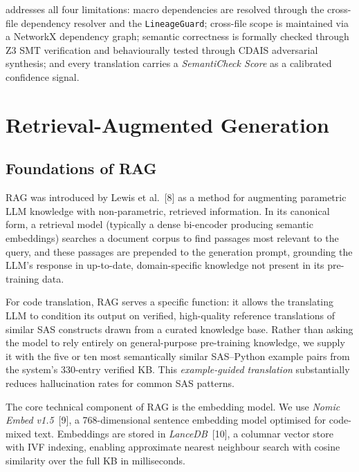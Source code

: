 \codara{} addresses all four limitations: macro dependencies are resolved
through the cross-file dependency resolver and the \texttt{LineageGuard};
cross-file scope is maintained via a NetworkX dependency graph; semantic
correctness is formally checked through Z3 \ac{SMT} verification and
behaviourally tested through \ac{CDAIS} adversarial synthesis; and every
translation carries a \textit{SemantiCheck Score} as a calibrated confidence
signal.

\section{Retrieval-Augmented Generation}
\label{sec:rag-theory}

\subsection{Foundations of RAG}
\label{subsec:rag-foundations}

\ac{RAG} was introduced by Lewis et al.~[8] as a method for augmenting
parametric \ac{LLM} knowledge with non-parametric, retrieved information.
In its canonical form, a retrieval model (typically a dense bi-encoder
producing semantic embeddings) searches a document corpus to find passages
most relevant to the query, and these passages are prepended to the generation
prompt, grounding the \ac{LLM}'s response in up-to-date, domain-specific
knowledge not present in its pre-training data.

For code translation, \ac{RAG} serves a specific function: it allows the
translating \ac{LLM} to condition its output on verified, high-quality
reference translations of similar SAS constructs drawn from a curated knowledge
base. Rather than asking the model to rely entirely on general-purpose
pre-training knowledge, we supply it with the five or ten most semantically
similar SAS--Python example pairs from the system's 330-entry verified \ac{KB}.
This \emph{example-guided translation} substantially reduces hallucination rates
for common SAS patterns.

The core technical component of \ac{RAG} is the embedding model. We use
\textit{Nomic Embed v1.5}~[9], a 768-dimensional sentence embedding model
optimised for code-mixed text. Embeddings are stored in \textit{LanceDB}~[10],
a columnar vector store with \ac{IVF} indexing, enabling approximate nearest
neighbour search with cosine similarity over the full \ac{KB} in milliseconds.

